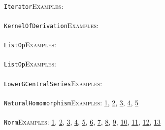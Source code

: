 \documentclass[a4paper,11pt]{report}
\begin{document}
{{ \\
 \texttt{Iterator}{\nobreakspace}{\nobreakspace}{\nobreakspace}{\nobreakspace}\textsc{Examples:} \\
 \\
 \texttt{KernelOfDerivation}{\nobreakspace}{\nobreakspace}{\nobreakspace}{\nobreakspace}\textsc{Examples:} \\
 \\
 \texttt{ListOp}{\nobreakspace}{\nobreakspace}{\nobreakspace}{\nobreakspace}\textsc{Examples:} \\
 \\
 \texttt{ListOp}{\nobreakspace}{\nobreakspace}{\nobreakspace}{\nobreakspace}\textsc{Examples:} \\
 \\
 \texttt{LowerGCentralSeries}{\nobreakspace}{\nobreakspace}{\nobreakspace}{\nobreakspace}\textsc{Examples:} \\
 \\
 \texttt{NaturalHomomorphism}{\nobreakspace}{\nobreakspace}{\nobreakspace}{\nobreakspace}\textsc{Examples:} \href{../www/SideLinks/About/aboutParallel.html} {1}{\nobreakspace}, \href{../www/SideLinks/About/aboutCoefficientSequence.html} {2}{\nobreakspace}, \href{../www/SideLinks/About/aboutRosenbergerMonster.html} {3}{\nobreakspace}, \href{../www/SideLinks/About/aboutExtensions.html} {4}{\nobreakspace}, \href{../www/SideLinks/About/aboutTensorSquare.html} {5}{\nobreakspace} \\
 \\
 \texttt{Norm}{\nobreakspace}{\nobreakspace}{\nobreakspace}{\nobreakspace}\textsc{Examples:} \href{tutorial/chap10.html} {1}{\nobreakspace}, \href{../www/SideLinks/About/aboutModPRings.html} {2}{\nobreakspace}, \href{../www/SideLinks/About/aboutNonabelian.html} {3}{\nobreakspace}, \href{../www/SideLinks/About/aboutParallel.html} {4}{\nobreakspace}, \href{../www/SideLinks/About/aboutPerformance.html} {5}{\nobreakspace}, \href{../www/SideLinks/About/aboutPeriodic.html} {6}{\nobreakspace}, \href{../www/SideLinks/About/aboutCoefficientSequence.html} {7}{\nobreakspace}, \href{../www/SideLinks/About/aboutPersistent.html} {8}{\nobreakspace}, \href{../www/SideLinks/About/aboutPoincareSeries.html} {9}{\nobreakspace}, \href{../www/SideLinks/About/aboutRosenbergerMonster.html} {10}{\nobreakspace}, \href{../www/SideLinks/About/aboutDefinitions.html} {11}{\nobreakspace}, \href{../www/SideLinks/About/aboutExtensions.html} {12}{\nobreakspace}, \href{../www/SideLinks/About/aboutGouter.html} {13}{\nobreakspace} \\
}}
\end{document}
